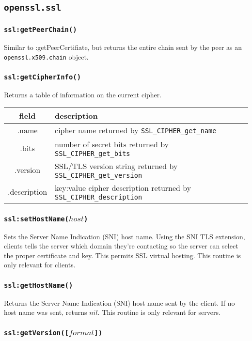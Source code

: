 \documentclass[11pt, oneside]{memoir}
\newcommand*{\fn}[1]{\texttt{#1}\xspace}
\newcommand*{\module}[1]{\texttt{#1}\xspace}
\newcounter{toccols}
\newenvironment{Module}[1]{
	\subsection{\texttt{#1}}
	\addtocontents{toc}{
		\protect\begin{multicols}{\value{toccols}}
	}
}{
	\addtocontents{toc}{\protect\end{multicols}}
}
\begin{document}
\begin{Module}{openssl.ssl}
\subsubsection[\fn{ssl:getPeerChain}]{\fn{ssl:getPeerChain()}}

Similar to :getPeerCertifiate, but returns the entire chain sent by the peer as an \module{openssl.x509.chain} object.

\subsubsection[\fn{ssl:getCipherInfo}]{\fn{ssl:getCipherInfo()}}

Returns a table of information on the current cipher. 

\begin{tabular}{ c | l }
field & description\\\hline
.name & cipher name returned by \fn{SSL\_CIPHER\_get\_name}\\
.bits & number of secret bits returned by \fn{SSL\_CIPHER\_get\_bits}\\
.version & SSL/TLS version string returned by \fn{SSL\_CIPHER\_get\_version}\\
.description & key:value cipher description returned by \fn{SSL\_CIPHER\_description}
\end{tabular}

\subsubsection[\fn{ssl:setHostName}]{\fn{ssl:setHostName($host$)}}

Sets the Server Name Indication (SNI) host name. Using the SNI TLS extension, clients tells the server which domain they're contacting so the server can select the proper certificate and key. This permits SSL virtual hosting. This routine is only relevant for clients.

\subsubsection[\fn{ssl:getHostName}]{\fn{ssl:getHostName()}}

Returns the Server Name Indication (SNI) host name sent by the client. If no host name was sent, returns $nil$. This routine is only relevant for servers.

\subsubsection[\fn{ssl:getVersion}]{\fn{ssl:getVersion([$format$])}}


\end{Module}
\end{document}
